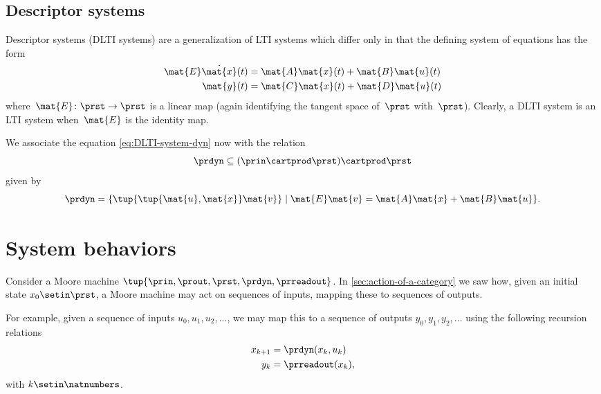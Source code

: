\subsection{Descriptor systems}

Descriptor systems (DLTI systems) are a generalization of LTI systems which differ only in that the defining system of equations has the form
\begin{align}
    \mat{E} \dot{\mat{x}}(t) & = \mat{A}\mat{x}(t) + \mat{B}\mat{u}(t) \label{eq:DLTI-system-dyn} \\
    \mat{y}(t)               & = \mat{C}\mat{x}(t) + \mat{D}\mat{u}(t) \label{eq:DLTI-system-ro}
\end{align}
where~$\mat{E}\colon \prst \to \prst$ is a linear map (again identifying the tangent space of~$\prst$ with~$\prst$).
Clearly, a DLTI system is an LTI system when~$\mat{E}$ is the identity map.

We associate the equation \cref{eq:DLTI-system-dyn} now with the relation
\begin{equation*}
    \prdyn \subseteq  (\prin \cartprod \prst) \cartprod \prst
\end{equation*}
given by
\begin{equation*}
    \prdyn = \{ \tup{ \tup{\mat{u}, \mat{x}} \mat{v}} \mid \mat{E} \mat{v} = \mat{A}\mat{x} + \mat{B}\mat{u} \}.
\end{equation*}

\section{System behaviors}


Consider a Moore machine $\tup{\prin, \prout, \prst, \prdyn, \prreadout}$.
In \cref{sec:action-of-a-category} we saw how, given an initial state $x_0 \setin \prst$, a Moore machine may act on sequences of inputs, mapping these to sequences of outputs.

For example, given a sequence of inputs $u_0, u_1, u_2, .
    .. $, we may map this to a sequence of outputs $y_0, y_1, y_2, ... $ using the following recursion relations
\begin{align}
    x_{k+1} & = \prdyn(x_k, u_k) \label{eq:state-recursion-1} \\
    y_{k}   & = \prreadout(x_{k}), \label{eq:state-recursion-2}
\end{align}
with $k \setin \natnumbers$.

